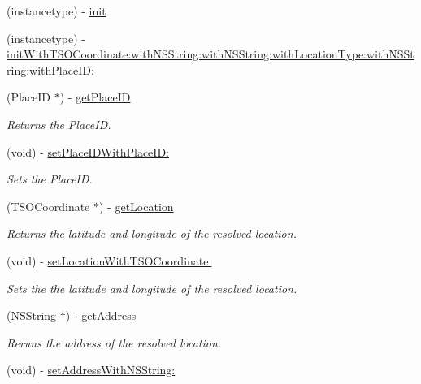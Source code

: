 \begin{DoxyCompactItemize}
\item 
(instancetype) -\/ \hyperlink{interface_resolved_location_ac968e5906c4bdac7750e62988bcee287}{init}
\item 
(instancetype) -\/ \hyperlink{interface_resolved_location_af6ea32fd5d15474b3ebb4c6dea0056e6}{init\+With\+T\+S\+O\+Coordinate\+:with\+N\+S\+String\+:with\+N\+S\+String\+:with\+Location\+Type\+:with\+N\+S\+String\+:with\+Place\+I\+D\+:}
\item 
(Place\+I\+D $\ast$) -\/ \hyperlink{interface_resolved_location_a2a78cde7a7a25c1e47839e4c3efecaab}{get\+Place\+I\+D}
\begin{DoxyCompactList}\small\item\em Returns the Place\+I\+D. \end{DoxyCompactList}\item 
(void) -\/ \hyperlink{interface_resolved_location_a9c5bce36e8e0d361680283c26d6c6c6c}{set\+Place\+I\+D\+With\+Place\+I\+D\+:}
\begin{DoxyCompactList}\small\item\em Sets the Place\+I\+D. \end{DoxyCompactList}\item 
(T\+S\+O\+Coordinate $\ast$) -\/ \hyperlink{interface_resolved_location_a16b9695d1a1b80e8360d25172e561654}{get\+Location}
\begin{DoxyCompactList}\small\item\em Returns the latitude and longitude of the resolved location. \end{DoxyCompactList}\item 
(void) -\/ \hyperlink{interface_resolved_location_a898160640576a3e395d27349bcfc13d4}{set\+Location\+With\+T\+S\+O\+Coordinate\+:}
\begin{DoxyCompactList}\small\item\em Sets the the latitude and longitude of the resolved location. \end{DoxyCompactList}\item 
(N\+S\+String $\ast$) -\/ \hyperlink{interface_resolved_location_a0b229e5202a3253f998607c819349d34}{get\+Address}
\begin{DoxyCompactList}\small\item\em Reruns the address of the resolved location. \end{DoxyCompactList}\item 
(void) -\/ \hyperlink{interface_resolved_location_a790bc2c89e573ff0e49275cbcec3c8fa}{set\+Address\+With\+N\+S\+String\+:}

\end{DoxyCompactItemize}
